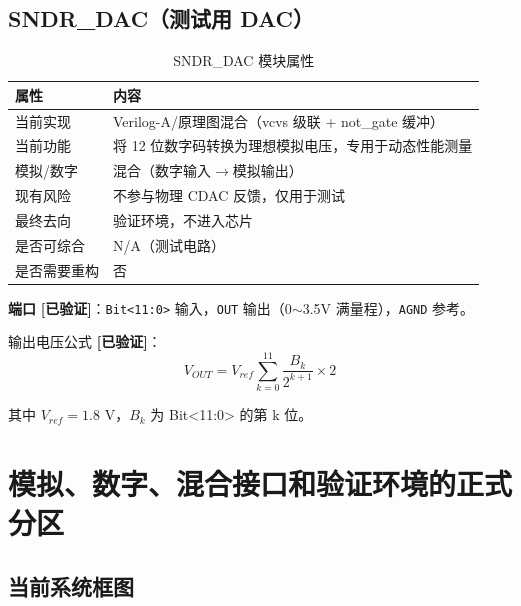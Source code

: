 \documentclass[UTF8,a4paper,11pt]{ctexart}
\newcommand{\verified}{\textcolor{verifiedgreen}{\textbf{[已验证]}}}
\begin{document}
\subsection{SNDR\_DAC（测试用 DAC）}

\begin{table}[H]
\centering
\caption{SNDR\_DAC 模块属性}
\label{tab:sndr-attr}
\begin{tabular}{ll}
\toprule
属性 & 内容 \\
\midrule
当前实现   & Verilog-A/原理图混合（vcvs 级联 + not\_gate 缓冲） \\
当前功能   & 将 12 位数字码转换为理想模拟电压，专用于动态性能测量 \\
模拟/数字  & 混合（数字输入$\rightarrow$模拟输出） \\
现有风险   & 不参与物理 CDAC 反馈，仅用于测试 \\
最终去向   & 验证环境，不进入芯片 \\
是否可综合 & N/A（测试电路） \\
是否需要重构 & 否 \\
\bottomrule
\end{tabular}
\end{table}

\textbf{端口} \verified：\texttt{Bit<11:0>} 输入，\texttt{OUT} 输出（0$\sim$3.5V 满量程），\texttt{AGND} 参考。

输出电压公式 \verified：
\begin{equation}
V_{OUT} = V_{ref} \sum_{k=0}^{11} \frac{B_k}{2^{k+1}} \times 2
\label{eq:sndr-dac}
\end{equation}

其中 $V_{ref} = 1.8$ V，$B_k$ 为 Bit<11:0> 的第 k 位。

\section{模拟、数字、混合接口和验证环境的正式分区}

\subsection{当前系统框图}
\end{document}
